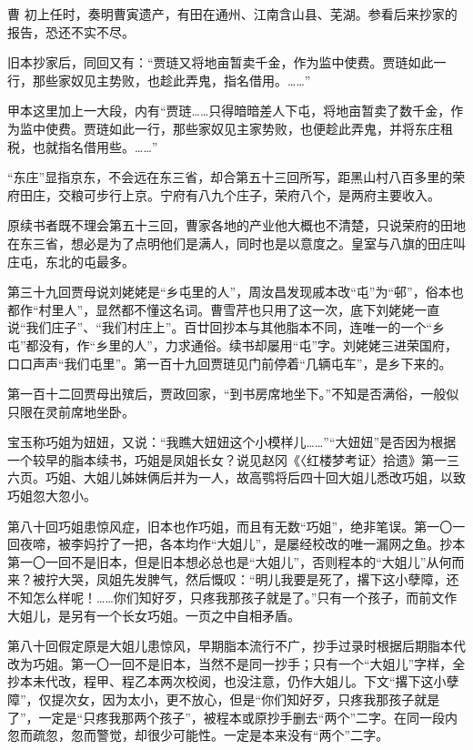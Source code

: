 \par 曹 初上任时，奏明曹寅遗产，有田在通州、江南含山县、芜湖。参看后来抄家的报告，恐还不实不尽。
\par 旧本抄家后，同回又有：“贾琏又将地亩暂卖千金，作为监中使费。贾琏如此一行，那些家奴见主势败，也趁此弄鬼，指名借用。……”
\par 甲本这里加上一大段，内有“贾琏……只得暗暗差人下屯，将地亩暂卖了数千金，作为监中使费。贾琏如此一行，那些家奴见主家势败，也便趁此弄鬼，并将东庄租税，也就指名借用些。……”
\par “东庄”显指京东，不会远在东三省，却合第五十三回所写，距黑山村八百多里的荣府田庄，交粮可步行上京。宁府有八九个庄子，荣府八个，是两府主要收入。
\par 原续书者既不理会第五十三回，曹家各地的产业他大概也不清楚，只说荣府的田地在东三省，想必是为了点明他们是满人，同时也是以意度之。皇室与八旗的田庄叫庄屯，东北的屯最多。
\par 第三十九回贾母说刘姥姥是“乡屯里的人”，周汝昌发现戚本改“屯”为“邨”，俗本也都作“村里人”，显然都不懂这名词。曹雪芹也只用了这一次，底下刘姥姥一直说“我们庄子”、“我们村庄上”。百廿回抄本与其他脂本不同，连唯一的一个“乡屯”都没有，作“乡里的人”，力求通俗。续书却屡用“屯”字。刘姥姥三进荣国府，口口声声“我们屯里”。第一百十九回贾琏见门前停着“几辆屯车”，是乡下来的。
\par 第一百十二回贾母出殡后，贾政回家，“到书房席地坐下。”不知是否满俗，一般似只限在灵前席地坐卧。
\par 宝玉称巧姐为妞妞，又说：“我瞧大妞妞这个小模样儿……”“大妞妞”是否因为根据一个较早的脂本续书，巧姐是凤姐长女？说见赵冈《〈红楼梦考证〉拾遗》第一三六页。巧姐、大姐儿姊妹俩后并为一人，故高鹗将后四十回大姐儿悉改巧姐，以致巧姐忽大忽小。
\par 第八十回巧姐患惊风症，旧本也作巧姐，而且有无数“巧姐”，绝非笔误。第一〇一回夜啼，被李妈拧了一把，各本均作“大姐儿”，是屡经校改的唯一漏网之鱼。抄本第一〇一回不是旧本，但是旧本想必总也是“大姐儿”，否则程本的“大姐儿”从何而来？被拧大哭，凤姐先发脾气，然后慨叹：“明儿我要是死了，撂下这小孽障，还不知怎么样呢！……你们知好歹，只疼我那孩子就是了。”只有一个孩子，而前文作大姐儿，是另有一个长女巧姐。一页之中自相矛盾。
\par 第八十回假定原是大姐儿患惊风，早期脂本流行不广，抄手过录时根据后期脂本代改为巧姐。第一〇一回不是旧本，当然不是同一抄手；只有一个“大姐儿”字样，全抄本未代改，程甲、程乙本两次校阅，也没注意，仍作大姐儿。下文“撂下这小孽障”，仅提次女，因为太小，更不放心，但是“你们知好歹，只疼我那孩子就是了”，一定是“只疼我那两个孩子”，被程本或原抄手删去“两个”二字。在同一段内忽而疏忽，忽而警觉，却很少可能性。一定是本来没有“两个”二字。
